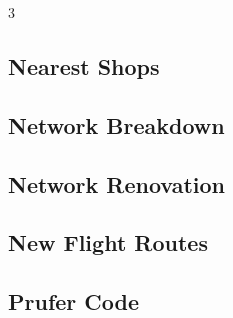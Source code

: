 \documentclass[8pt]{extarticle}
\begin{document}
\begin{multicols*}{3}
\subsection{Nearest Shops}
\begin{caixaenunciado}

\end{caixaenunciado}
\vspace{0.3cm}


\subsection{Network Breakdown}
\begin{caixaenunciado}

\end{caixaenunciado}
\vspace{0.3cm}


\subsection{Network Renovation}
\begin{caixaenunciado}

\end{caixaenunciado}
\vspace{0.3cm}


\subsection{New Flight Routes}
\begin{caixaenunciado}

\end{caixaenunciado}
\vspace{0.3cm}


\subsection{Prufer Code}
\begin{caixaenunciado}

\end{caixaenunciado}
\vspace{0.3cm}



\end{multicols*}
\end{document}
